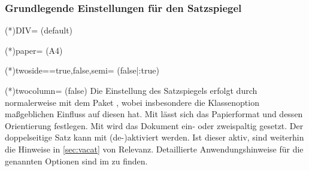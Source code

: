\begin{DeclareEntity*}{}
\begin{DeclareEntity*}{}
\begin{DeclareEntity*}{}
\subsubsection{Grundlegende Einstellungen für den Satzspiegel}
%
\begin{Declaration}
  {\Option(*){DIV=\PMisc}}
  (default)
\begin{Declaration}
  {\Option(*){paper=\PMisc}}
  (A4)
\begin{Declaration}
  {\Option(*){twoside=\PMisc}}=true,false,semi=
  (false|:true)
\begin{Declaration}
  {\Option(*){twocolumn=\PBoolean}}
  (false)
Die Einstellung des Satzspiegels erfolgt durch \KOMAScript normalerweise mit 
dem Paket , wobei insbesondere die Klassenoption 
 maßgeblichen Einfluss auf diesen hat. Mit 
 lässt sich das Papierformat und dessen Orientierung 
festlegen. Mit  wird das Dokument ein- oder 
zweispaltig gesetzt. Der doppelseitige Satz kann mit  
(de-)aktiviert werden. Ist dieser aktiv, sind weiterhin die Hinweise in 
\autoref{sec:vacat} von Relevanz. Detaillierte Anwendungshinweise für die 
genannten Optionen sind im \scrguide zu finden.
\end{Declaration}
\end{Declaration}
\end{Declaration}
\end{Declaration}




\end{DeclareEntity*}
\end{DeclareEntity*}
\end{DeclareEntity*}
